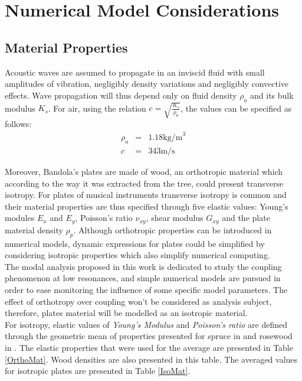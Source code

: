 \section{Numerical Model Considerations}

\subsection{Material Properties}

Acoustic waves are assumed to propagate in an inviscid fluid with small amplitudes of vibration, negligibly density variations and negligibly convective effects. Wave propagation will thus depend only on fluid density $\rho_a$ and its bulk modulus $K_s$. For air, using the relation $c= \sqrt{\frac{K_s}{\rho_0}}$, the values can be specified as follows:
\begin{eqnarray*}
\rho_a & = & 1.18 \text{kg/m}^3\\
c & = & 343 \text{m/s} 
\end{eqnarray*}

Moreover, Bandola's plates are made of wood, an orthotropic material which according to the way it was extracted from the tree, could present transverse isotropy. For plates of musical instruments transverse isotropy is common and their material properties are thus specified through five elastic values: Young's modules $E_x$ and $E_y$, Poisson's ratio $\nu_{xy}$, shear modulus $G_{xy}$ and the plate material density $\rho_p$. Although orthotropic properties can be introduced in numerical models, dynamic expressions for plates could be simplified by considering isotropic properties which also simplify numerical computing.\\

The modal analysis proposed in this work is dedicated to study the coupling phenomenon at low resonances, and simple numerical models are pursued in order to ease monitoring the influence of some specific model parameters. The effect of orthotropy over coupling won't be considered as analysis subject, therefore, plates material will be modelled as an isotropic material.\\

For isotropy, elastic values of \textit{Young's Modulus} and \textit{Poisson's ratio} are defined through the geometric mean of properties presented for spruce in \cite{J.Torres1} and rosewood in \cite{Elejabarrieta}. The elastic properties that were used for the average are presented in Table \ref{OrthoMat}. Wood densities are also presented in this table. The averaged values for isotropic plates are presented in Table \ref{IsoMat}.  

